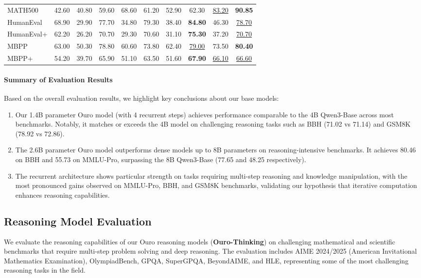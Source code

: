 \documentclass[]{bytedance_seed}
\newcommand{\1}{\mathbf{1}}
\begin{document}
\begin{table}[htbp]
\begin{tabular}{@{}lccccccccc@{}}
MATH500 & 42.60 & 40.80 & 59.60 & 68.60 & 61.20 & 52.90 & 62.30 & \underline{83.20} & \cellcolor{lightergray}\textbf{90.85} \\
HumanEval & 68.90 & 29.90 & 77.70 & 34.80 & 79.30 & 38.40 & \textbf{84.80} & 46.30 & \cellcolor{lightergray}\underline{78.70} \\
HumanEval+ & 62.20 & 26.20 & 70.70 & 29.30 & 70.60 & 31.10 & \textbf{75.30} & 37.20 & \cellcolor{lightergray}\underline{70.70} \\
MBPP & 63.00 & 50.30 & 78.80 & 60.60 & 73.80 & 62.40 & \underline{79.00} & 73.50 & \cellcolor{lightergray}\textbf{80.40} \\
MBPP+ & 54.20 & 39.70 & 65.90 & 51.10 & 63.50 & 51.60 & \textbf{67.90} & \underline{66.10} & \cellcolor{lightergray}\underline{66.60} \\
\bottomrule
\end{tabular}
\end{table}
\paragraph{Summary of Evaluation Results}
Based on the overall evaluation results, we highlight key conclusions about our base models:
\begin{enumerate}[label=(\arabic*)]
\item Our 1.4B parameter Ouro model (with 4 recurrent steps) achieves performance comparable to the 4B Qwen3-Base across most benchmarks. Notably, it matches or exceeds the 4B model on challenging reasoning tasks such as BBH (71.02 vs 71.14) and GSM8K (78.92 vs 72.86).

\item The 2.6B parameter Ouro model outperforms dense models up to 8B parameters on reasoning-intensive benchmarks. It achieves 80.46 on BBH and 55.73 on MMLU-Pro, surpassing the 8B Qwen3-Base (77.65 and 48.25 respectively).

\item The recurrent architecture shows particular strength on tasks requiring multi-step reasoning and knowledge manipulation, with the most pronounced gains observed on MMLU-Pro, BBH, and GSM8K benchmarks, validating our hypothesis that iterative computation enhances reasoning capabilities.
\end{enumerate}



\subsection{Reasoning Model Evaluation}
We evaluate the reasoning capabilities of our Ouro reasoning models (\textbf{Ouro-Thinking}) on challenging mathematical and scientific benchmarks that require multi-step problem solving and deep reasoning. The evaluation includes AIME 2024/2025 (American Invitational Mathematics Examination), OlympiadBench, GPQA, SuperGPQA, BeyondAIME, and HLE, representing some of the most challenging reasoning tasks in the field.
\end{document}
